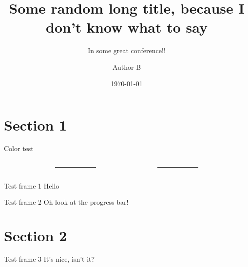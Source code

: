 \documentclass[%
	debug,
	sectionpage,
    listings={
        Lean=listings-lean,
        Go
    },
	withappendix,
	english,
]{rainbow-beamer}
\title[Short title]{Some random long title, because I don't know what to say}
\subtitle{In some great conference!!}
\author[\speaker{A} \and B]{\speaker{Speaker A} \and Author B}
\date{\today}
\begin{document}
\section{Section 1}

\begin{frame}{Color test}
	\footnotesize
	\sffamily
	\begin{columns}
		\begin{column}{.27\linewidth}
			\begin{testcolors}[HTML]
			\end{testcolors}
		\end{column}
		\begin{column}{.05\linewidth}
			\centering
			\rule{.1mm}{.7\textheight}
		\end{column}
		\begin{column}{.27\linewidth}
			\begin{testcolors}[HTML]
			\end{testcolors}
		\end{column}
		\begin{column}{.05\linewidth}
			\centering
			\rule{.1mm}{.7\textheight}
		\end{column}
		\begin{column}{.27\linewidth}
			\begin{testcolors}[HTML]
			\end{testcolors}
		\end{column}
	\end{columns}
\end{frame}

\begin{frame}{Test frame 1}
	Hello
\end{frame}

\begin{frame}{Test frame 2}
	Oh look at the progress bar!
\end{frame}

\section{Section 2}

\begin{frame}{Test frame 3}
	It's nice, isn't it?
\end{frame}
\end{document}
